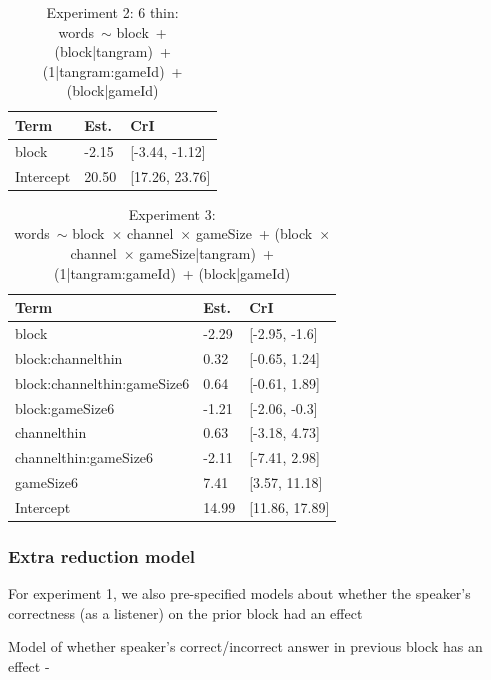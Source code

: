 \documentclass[
  english,
  a4paper,
]{article}
\begin{document}
\begin{table}[h!]

\caption{\label{tab:unnamed-chunk-12}Experiment 2: 6 thin:\\ words~$\sim$ block~+ (block|tangram)~+ (1|tangram:gameId)~+ (block|gameId)}
\centering
\begin{tabular}[t]{lll}
\toprule
Term & Est. & CrI\\
\midrule
block & -2.15 & {}[-3.44, -1.12]\\
Intercept & 20.50 & {}[17.26, 23.76]\\
\bottomrule
\end{tabular}
\end{table}

\begin{table}[h!]

\caption{\label{tab:unnamed-chunk-12}Experiment 3:\\ words~$\sim$ block~$\times$ channel~$\times$ gameSize~+ (block~$\times$ channel~$\times$ gameSize|tangram)~+ (1|tangram:gameId)~+ (block|gameId)}
\centering
\begin{tabular}[t]{lll}
\toprule
Term & Est. & CrI\\
\midrule
block & -2.29 & {}[-2.95, -1.6]\\
block:channelthin & 0.32 & {}[-0.65, 1.24]\\
block:channelthin:gameSize6 & 0.64 & {}[-0.61, 1.89]\\
block:gameSize6 & -1.21 & {}[-2.06, -0.3]\\
channelthin & 0.63 & {}[-3.18, 4.73]\\
\addlinespace
channelthin:gameSize6 & -2.11 & {}[-7.41, 2.98]\\
gameSize6 & 7.41 & {}[3.57, 11.18]\\
Intercept & 14.99 & {}[11.86, 17.89]\\
\bottomrule
\end{tabular}
\end{table}

\hypertarget{extra-reduction-model}{%
\subsubsection{Extra reduction model}\label{extra-reduction-model}}

For experiment 1, we also pre-specified models about whether the speaker's correctness (as a listener) on the prior block had an effect

Model of whether speaker's correct/incorrect answer in previous block has an effect -
\end{document}
